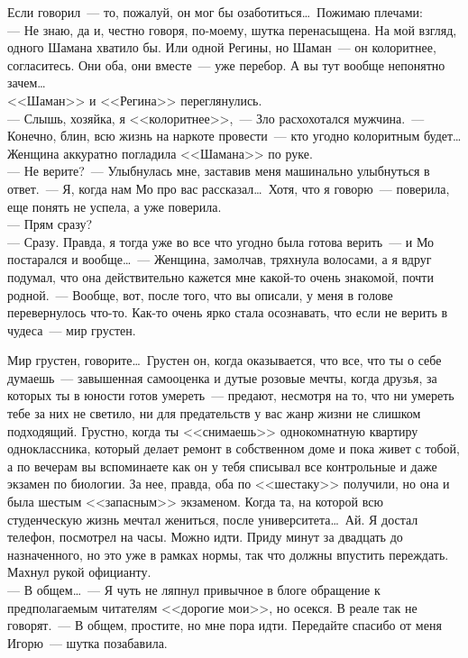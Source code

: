 Если говорил~--- то, пожалуй, он мог бы озаботиться\ldots\ Пожимаю плечами:\\
--- Не знаю, да и, честно говоря, по-моему, шутка перенасыщена. На мой взгляд, 
одного Шамана хватило бы. Или одной Регины, но Шаман~--- он колоритнее, 
согласитесь. Они оба, они вместе~--- уже перебор. А вы тут вообще непонятно 
зачем\ldots\\
<<Шаман>> и <<Регина>> переглянулись.\\
--- Слышь, хозяйка, я <<колоритнее>>,~--- Зло расхохотался мужчина.~--- Конечно, 
блин, всю жизнь на наркоте провести~--- кто угодно колоритным будет\ldots\\
Женщина аккуратно погладила <<Шамана>> по руке.\\
--- Не верите?~--- Улыбнулась мне, заставив меня машинально улыбнуться в 
ответ.~--- Я, когда нам Мо про вас рассказал\ldots\ Хотя, что я говорю~--- поверила, еще 
понять не успела, а уже поверила. \\
--- Прям сразу?\\
--- Сразу. Правда, я тогда уже во все что угодно была готова верить~--- и Мо 
постарался и вообще\ldots~--- Женщина, замолчав, тряхнула волосами, а я вдруг 
подумал, что она действительно кажется мне какой-то очень знакомой, почти 
родной.~--- Вообще, вот, после того, что вы описали, у меня в голове 
перевернулось 
что-то. Как-то очень ярко стала осознавать, что если не верить в чудеса~--- мир 
грустен.

Мир грустен, говорите\ldots\ Грустен он, когда оказывается, что все, что ты о 
себе думаешь~--- завышенная самооценка и дутые розовые мечты, когда друзья, за 
которых ты в юности готов умереть~--- предают, несмотря на то, что ни умереть тебе за 
них не светило, ни для предательств у вас жанр жизни не слишком подходящий. 
Грустно, когда ты <<снимаешь>> однокомнатную квартиру одноклассника, который делает 
ремонт в собственном доме и пока живет с тобой, а по вечерам вы вспоминаете как он у 
тебя списывал все контрольные и даже экзамен по биологии. За нее, правда, оба 
по <<шестаку>> получили, но она и была шестым <<запасным>> экзаменом. Когда та, на 
которой всю студенческую жизнь мечтал жениться, после университета\ldots\ Ай. Я 
достал телефон, посмотрел на часы. Можно идти. Приду минут за двадцать до 
назначенного, но это уже в рамках нормы, так что должны впустить переждать. 
Махнул рукой официанту.\\
--- В общем\ldots~--- Я чуть не ляпнул привычное в блоге обращение к 
предполагаемым 
читателям <<дорогие мои>>, но осекся. В реале так не говорят.~--- В общем, 
простите, 
но мне пора идти. Передайте спасибо от меня Игорю~--- шутка позабавила. 

